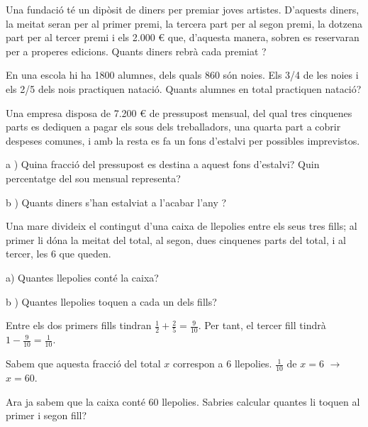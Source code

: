 \begin{mylist}
	\exer  Una fundació té un dipòsit de diners per premiar joves artistes. D'aquests diners, la meitat seran per al primer premi, la tercera part per al segon premi, la dotzena part per al tercer premi i els 2.000 € que, d'aquesta manera, sobren es reservaran per a properes edicions. Quants diners rebrà cada premiat ?




	\exer  En una escola hi ha 1800 alumnes, dels quals 860 són noies. Els 3/4 de les noies i els 2/5 dels nois practiquen natació. Quants alumnes en total practiquen natació?




	\exer  Una empresa disposa de 7.200 € de pressupost mensual, del qual tres cinquenes parts es dediquen a pagar els sous dels treballadors, una quarta part a cobrir despeses comunes, i amb la resta es fa un fons d'estalvi per possibles imprevistos.


a ) Quina fracció del pressupost es destina a aquest fons d'estalvi? Quin percentatge del sou mensual representa?

b ) Quants diners s'han estalviat a l'acabar l'any ?

\answers{[$\dfrac{3}{20}=15$ \%, $12960$ \euro{}]}


	\exer  Una mare divideix el contingut d'una caixa de llepolies entre els seus tres fills; al primer li dóna la meitat del total, al segon, dues cinquenes parts del total, i al tercer, les 6 que queden. 


a) Quantes llepolies conté la caixa? 

b ) Quantes llepolies toquen a cada un dels fills?
\vspace{0.5cm}


\end{mylist}

\begin{example}[*]
	Entre els dos primers fills tindran $\frac{1}{2} + \frac{2}{5}= \frac{9}{10}$.
	Per tant, el tercer fill tindrà $1-\frac{9}{10}= \frac{1}{10}$.
	
	Sabem que aquesta fracció del total $x$ correspon a 6 llepolies.
	$\frac{1}{10} \text{ de } x = 6$ \quad $\rightarrow$ \quad $x=60$.
	
	Ara ja sabem que la caixa conté 60 llepolies. Sabries calcular quantes li toquen al primer i segon fill?
	
\end{example}

